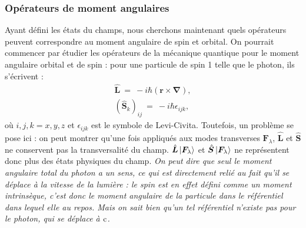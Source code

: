 \subsubsection{Opérateurs de moment angulaires} 
Ayant défini les états du champs, nous cherchons maintenant quels opérateurs peuvent correspondre au moment angulaire de spin et orbital. On pourrait commencer par étudier les opérateurs de la mécanique quantique pour le moment angulaire orbital et de spin : pour une particule de spin 1 telle que le photon, ils s'écrivent :
\begin{align}
\hat{\bm{L}}~=~-i\hbar(\bm{r}\times\bm{\nabla}),\\
(\hat{\bm{S}}_k)_{ij}~=~-i\hbar\epsilon_{ijk},
\label{defLS_hat}
\end{align} 
où $i,j,k=x,y,z$ et $\epsilon_{ijk}$ est le symbole de Levi-Civita.
Toutefois, un problème se pose ici : on peut montrer qu'une fois appliqués aux modes transverses $\bm{F}_\lambda$, $\hat{\bm{L}}$ et $\hat{\bm{S}}$ ne conservent pas la transversalité du champ. $\hat{\bm{L}}\ket{\bm{F}_\lambda}$ et $\hat{\bm{S}}\ket{\bm{F}_\lambda}$ ne représentent donc plus des états physiques du champ. \textsl{On peut dire que seul le moment angulaire total du photon a un sens, ce qui est directement relié au fait qu'il se déplace à la vitesse de la lumière : le spin est en effet défini comme un moment \textit{intrinsèque}, c'est donc le moment angulaire de la particule dans le référentiel dans lequel elle au repos. Mais on sait bien qu'un tel référentiel n'existe pas pour le photon, qui se déplace à $\mathrm{c}$.}

